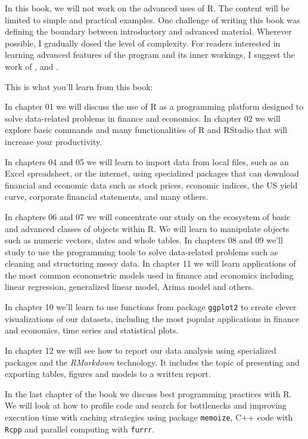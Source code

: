 \documentclass[
  12pt,
]{book}
\providecommand{\tightlist}{%
  \setlength{\itemsep}{0pt}\setlength{\parskip}{0pt}}
\begin{document}
In this book, we will not work on the advanced uses of R. The content will be limited to simple and practical examples. One challenge of writing this book was defining the boundary between introductory and advanced material. Wherever possible, I gradually dosed the level of complexity. For readers interested in learning advanced features of the program and its inner workings, I suggest the work of \citet{venables2004introduction}, \citet{teetor2011r} and \citet{wickham2019advanced}.

This is what you'll learn from this book:

\begin{description}
\tightlist
\item[Using R and RStudio]
In chapter 01 we will discuss the use of R as a programming platform designed to solve data-related problems in finance and economics. In chapter 02 we will explore basic commands and many functionalities of R and RStudio that will increase your productivity.
\item[Importing financial and economic data]
In chapters 04 and 05 we will learn to import data from local files, such as an Excel spreadsheet, or the internet, using specialized packages that can download financial and economic data such as stock prices, economic indices, the US yield curve, corporate financial statements, and many others.
\item[Cleaning, structuring and analyzing the data with R]
In chapters 06 and 07 we will concentrate our study on the ecosystem of basic and advanced classes of objects within R. We will learn to manipulate objects such as numeric vectors, dates and whole tables. In chapters 08 and 09 we'll study to use the programming tools to solve data-related problems such as cleaning and structuring messy data. In chapter 11 we will learn applications of the most common econometric models used in finance and economics including linear regression, generalized linear model, Arima model and others.
\item[Creating a visual analysis of data]
In chapter 10 we'll learn to use functions from package \texttt{ggplot2} to create clever visualizations of our datasets, including the most popular applications in finance and economics, time series and statistical plots.
\item[Reporting your results]
In chapter 12 we will see how to report our data analysis using specialized packages and the \emph{RMarkdown} technology. It includes the topic of presenting and exporting tables, figures and models to a written report.
\item[Writing better and faster code]
In the last chapter of the book we discuss best programming practices with R. We will look at how to profile code and search for bottlenecks and improving execution time with caching strategies using package \texttt{memoize}, C++ code with \texttt{Rcpp} and parallel computing with \texttt{furrr}.
\end{description}
\end{document}
